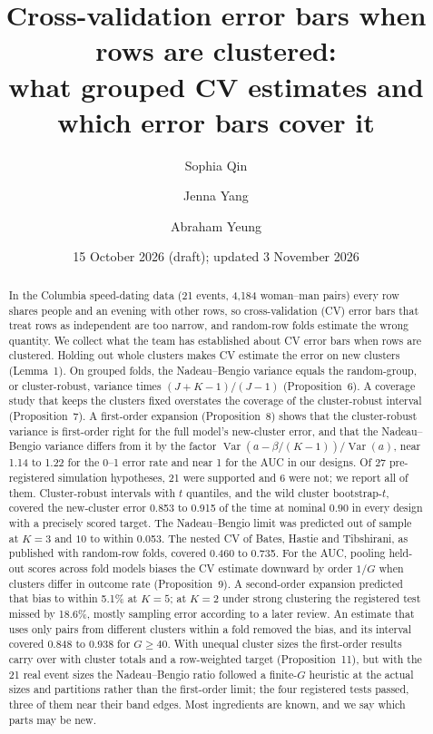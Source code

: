 \documentclass[11pt]{amsart}
\title[CV error bars under clustering]{Cross-validation error bars when rows are clustered:\\ what grouped CV estimates and which error bars cover it}
\author{Sophia Qin}
\author{Jenna Yang}
\author{Abraham Yeung}
\date{15 October 2026 (draft); updated 3 November 2026}
\theoremstyle{plain}
\theoremstyle{definition}
\theoremstyle{remark}
\newcommand{\Var}{\operatorname{Var}}
\begin{document}
\begin{abstract}
In the Columbia speed-dating data (21 events, 4,184 woman--man pairs) every row shares people and an evening with other rows, so cross-validation (CV) error bars that treat rows as independent are too narrow, and random-row folds estimate the wrong quantity. We collect what the team has established about CV error bars when rows are clustered. Holding out whole clusters makes CV estimate the error on new clusters (Lemma~1). On grouped folds, the Nadeau--Bengio variance equals the random-group, or cluster-robust, variance times $(J+K-1)/(J-1)$ (Proposition~6). A coverage study that keeps the clusters fixed overstates the coverage of the cluster-robust interval (Proposition~7). A first-order expansion (Proposition~8) shows that the cluster-robust variance is first-order right for the full model's new-cluster error, and that the Nadeau--Bengio variance differs from it by the factor $\Var(a-\beta/(K-1))/\Var(a)$, near 1.14 to 1.22 for the 0--1 error rate and near 1 for the AUC in our designs. Of 27 pre-registered simulation hypotheses, 21 were supported and 6 were not; we report all of them. Cluster-robust intervals with $t$ quantiles, and the wild cluster bootstrap-$t$, covered the new-cluster error 0.853 to 0.915 of the time at nominal $0.90$ in every design with a precisely scored target. The Nadeau--Bengio limit was predicted out of sample at $K=3$ and $10$ to within 0.053. The nested CV of Bates, Hastie and Tibshirani, as published with random-row folds, covered 0.460 to 0.735. For the AUC, pooling held-out scores across fold models biases the CV estimate downward by order $1/G$ when clusters differ in outcome rate (Proposition~9). A second-order expansion predicted that bias to within 5.1\% at $K=5$; at $K=2$ under strong clustering the registered test missed by 18.6\%, mostly sampling error according to a later review. An estimate that uses only pairs from different clusters within a fold removed the bias, and its interval covered 0.848 to 0.938 for $G\ge40$. With unequal cluster sizes the first-order results carry over with cluster totals and a row-weighted target (Proposition~11), but with the 21 real event sizes the Nadeau--Bengio ratio followed a finite-$G$ heuristic at the actual sizes and partitions rather than the first-order limit; the four registered tests passed, three of them near their band edges. Most ingredients are known, and we say which parts may be new.
\end{abstract}

\maketitle
\end{document}
